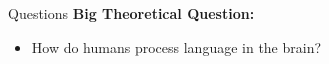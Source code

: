 \begin{frame}{Questions}
\textbf{\large Big Theoretical Question:} 
\begin{itemize}
    \item {\large How do humans process language in the brain?}
\end{itemize}
\pause

\bigskip




\end{frame}